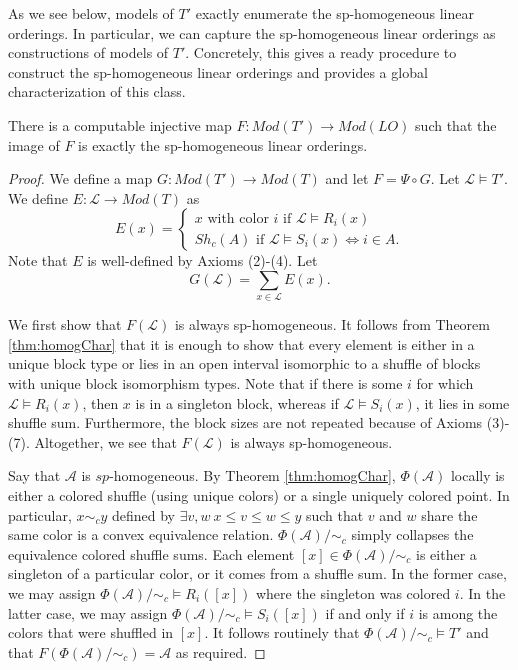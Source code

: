 \documentclass[11pt]{amsart}
\theoremstyle{definition}
\def\A{\mathcal A}
\def\L{\mathcal L}
\begin{document}
As we see below, models of $T'$ exactly enumerate the sp-homogeneous linear orderings.
In particular, we can capture the sp-homogeneous linear orderings as constructions of models of $T'$.
Concretely, this gives a ready procedure to construct the sp-homogeneous linear orderings and provides a global characterization of this class.

\begin{proposition}\label{prop:spImage}
    There is a computable injective map $F:Mod(T')\to Mod(LO)$ such that the image of $F$ is exactly the sp-homogeneous linear orderings. 
\end{proposition}

\begin{proof}
    We define a map $G:Mod(T')\to Mod(T)$ and let $F=\Psi\circ G$.
    Let $\L\models T'$.
    We define $E:\L\to Mod(T)$ as
    \[ E(x) = \begin{cases}
        x \text{ with color } i \text{ if } \L\models R_i(x) \\
        Sh_c(A) \text{ if } \L\models S_i(x) \iff i\in A.
    \end{cases}\]
    Note that $E$ is well-defined by Axioms (2)-(4).
    Let
    \[G(\L)= \sum_{x\in\L}E(x).\]

    We first show that $F(\L)$ is always sp-homogeneous.
    It follows from Theorem \ref{thm:homogChar} that it is enough to show that every element is either in a unique block type or lies in an open interval isomorphic to a shuffle of blocks with unique block isomorphism types.
    Note that if there is some $i$ for which $\L\models R_i(x)$, then $x$ is in a singleton block, whereas if $\L\models S_i(x)$, it lies in some shuffle sum.
    Furthermore, the block sizes are not repeated because of Axioms (3)-(7).
    Altogether, we see that $F(\L)$ is always sp-homogeneous.

    Say that $\A$ is $sp$-homogeneous.
    By Theorem \ref{thm:homogChar}, $\Phi(\A)$ locally is either a colored shuffle (using unique colors) or a single uniquely colored point.
    In particular, $x\sim_c y$ defined by $\exists v,w ~ x\leq v\leq w\leq y$ such that $v$ and $w$ share the same color is a convex equivalence relation.
    $\Phi(\A)/\sim_c$ simply collapses the equivalence colored shuffle sums.
    Each element $[x]\in \Phi(\A)/\sim_c$ is either a singleton of a particular color, or it comes from a shuffle sum.
    In the former case, we may assign $\Phi(\A)/\sim_c\models R_i([x])$ where the singleton was colored $i$.
    In the latter case, we may assign $\Phi(\A)/\sim_c\models S_i([x])$ if and only if $i$ is among the colors that were shuffled in $[x]$.
    It follows routinely that $\Phi(\A)/\sim_c\models T'$ and that $F(\Phi(\A)/\sim_c)=\A$ as required.
\end{proof}
\end{document}
